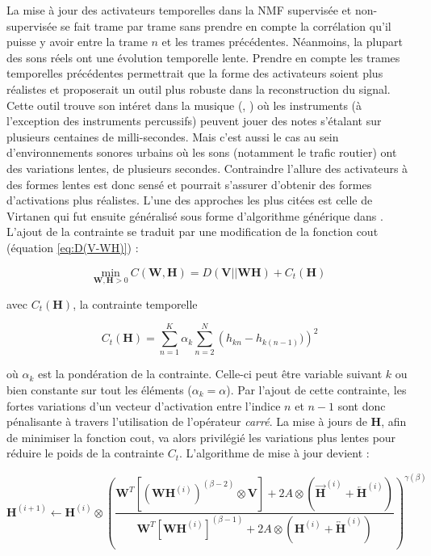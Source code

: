 La mise à jour des activateurs temporelles dans la NMF supervisée et non-supervisée se fait trame par trame sans prendre en compte la corrélation qu'il puisse y avoir entre la trame $n$ et les trames précédentes. Néanmoins, la plupart des sons réels ont une évolution temporelle lente. Prendre en compte les trames temporelles précédentes permettrait que la forme des activateurs soient plus réalistes et proposerait un outil plus robuste dans la reconstruction du signal. Cette outil trouve son intéret dans la musique (\cite{virtanen_sound_2003}, \cite{fevotte_majorization-minimization_2011}) où les instruments (à l'exception des instruments percussifs) peuvent jouer des notes s'étalant sur plusieurs centaines de milli-secondes. Mais c'est aussi le cas au sein d'environnements sonores urbains où les sons (notamment le trafic routier) ont des variations lentes, de plusieurs secondes. Contraindre l'allure des activateurs à des formes lentes est donc sensé et pourrait s'assurer d'obtenir des formes d'activations plus réalistes. L'une des approches les plus citées est celle de Virtanen \cite{virtanen_monaural_2007} qui fut ensuite généralisé sous forme d'algorithme générique dans \cite{fevotte2017single}.  L'ajout de la contrainte se traduit par une modification de la fonction cout (équation \ref{eq:D(V-WH)}) : 

\begin{equation}\label{eq:CostSmoothEssid}
\underset{\mathbf{W}, \mathbf{H} > 0}{\text{min}}~ C(\mathbf{W},\mathbf{H}) = D(\mathbf{V}\vert\vert \mathbf{WH}) + C_t(\mathbf{H})
\end{equation}

avec $C_t(\mathbf{H})$, la contrainte temporelle
 
\begin{equation}
C_t(\mathbf{H}) = \sum_{n=1}^K \alpha_k\sum_{n=2}^N \left(h_{kn} - h_{k(n-1)})\right)^2
\end{equation}

où $\alpha_k$ est la pondération de la contrainte. Celle-ci peut être variable suivant $k$ ou bien constante sur tout les éléments ($\alpha_k = \alpha$). Par l'ajout de cette contrainte, les fortes variations d'un vecteur d'activation entre l'indice $n$ et $n-1$ sont donc pénalisante à travers l'utilisation de l'opérateur \textit{carré}. La mise à jours de $\mathbf{H}$, afin de minimiser la fonction cout, va alors privilégié les variations plus lentes pour réduire le poids de la contrainte $C_t$. L'algorithme de mise à jour devient :

\begin{equation}
\textbf{H}^{(i+1)} \leftarrow \textbf{H}^{(i)} \otimes\left(\frac{\textbf{W}^T \left[\left(\textbf{WH}^{(i)} \right)^{(\beta-2)} \otimes \textbf{V} \right] + 2 A \otimes \left(\overrightarrow{\mathbf{H}}^{(i)} + \overleftarrow{\mathbf{H}}^{(i)} \right)}{\textbf{W}^T \left[\textbf{WH}^{(i)} \right]^{(\beta-1)} + 2 A \otimes \left(\mathbf{H}^{(i)} + \overleftrightarrow{\mathbf{H}}^{(i)} \right)}\right)^{\gamma(\beta)}\label{eq:HupdateSmooth}
\end{equation}

